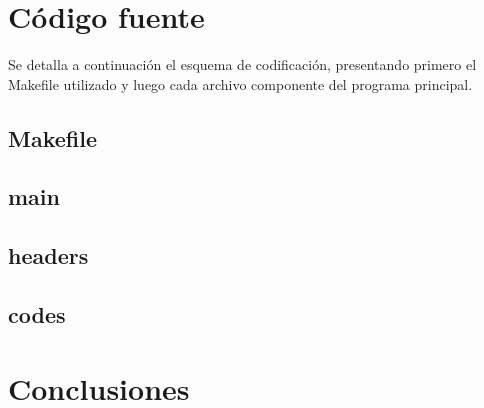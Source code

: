 \documentclass[10pt,a4paper]{report}
\begin{document}
\section{Código fuente}
Se detalla a continuación el esquema de codificación, presentando primero el Makefile utilizado y luego cada archivo componente del programa principal.

\subsection*{Makefile}

\subsection*{main}

\subsection*{headers}






\subsection*{codes}




\section{Conclusiones}
\end{document}
